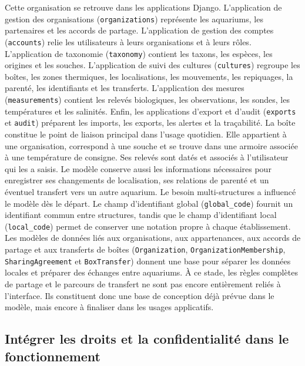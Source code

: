 \documentclass{article}
\begin{document}
Cette organisation se retrouve dans les applications Django. L’application de gestion des organisations (\texttt{organizations}) représente les aquariums, les partenaires et les accords de partage. L’application de gestion des comptes (\texttt{accounts}) relie les utilisateurs à leurs organisations et à leurs rôles. L’application de taxonomie (\texttt{taxonomy}) contient les taxons, les espèces, les origines et les souches. L’application de suivi des cultures (\texttt{cultures}) regroupe les boîtes, les zones thermiques, les localisations, les mouvements, les repiquages, la parenté, les identifiants et les transferts. L’application des mesures (\texttt{measurements}) contient les relevés biologiques, les observations, les sondes, les températures et les salinités. Enfin, les applications d’export et d’audit (\texttt{exports} et \texttt{audit}) préparent les imports, les exports, les alertes et la traçabilité.
La boîte constitue le point de liaison principal dans l’usage quotidien. Elle appartient à une organisation, correspond à une souche et se trouve dans une armoire associée à une température de consigne. Ses relevés sont datés et associés à l’utilisateur qui les a saisis. Le modèle conserve aussi les informations nécessaires pour enregistrer ses changements de localisation, ses relations de parenté et un éventuel transfert vers un autre aquarium.
Le besoin multi-structures a influencé le modèle dès le départ. Le champ d’identifiant global (\texttt{global\_code}) fournit un identifiant commun entre structures, tandis que le champ d’identifiant local (\texttt{local\_code}) permet de conserver une notation propre à chaque établissement. Les modèles de données liés aux organisations, aux appartenances, aux accords de partage et aux transferts de boîtes (\texttt{Organization}, \texttt{OrganizationMembership}, \texttt{SharingAgreement} et \texttt{BoxTransfer}) donnent une base pour séparer les données locales et préparer des échanges entre aquariums.
À ce stade, les règles complètes de partage et le parcours de transfert ne sont pas encore entièrement reliés à l’interface. Ils constituent donc une base de conception déjà prévue dans le modèle, mais encore à finaliser dans les usages applicatifs.

\subsection{Intégrer les droits et la confidentialité dans le fonctionnement}
\end{document}
